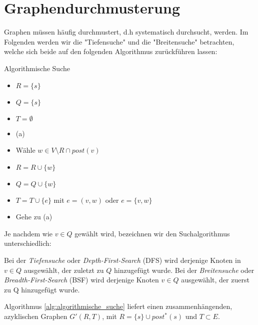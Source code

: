 \section{Graphendurchmusterung}
Graphen müssen häufig durchmustert, d.h systematisch durchsucht, werden. Im Folgenden werden wir die "Tiefensuche" und die "Breitensuche" betrachten, welche sich beide auf den folgenden Algorithmus zurückführen lassen:\\

\begin{algorithm}[H]
\label{alg:algorithmische_suche}
\caption{Algorithmische Suche}
\begin{itemize}
	\item $R=\{s\}$
	\item $Q= \{s\}$
	\item $T= \emptyset$
	\item (a) 
	\item Wähle $w \in  V \setminus R \cap post(v)$
	\item $R=R \cup \{w\}$
	\item $Q=Q \cup \{w\} $
	\item $T= T \cup \{e\} $ mit $e=(v,w)$ oder $e=\{v,w\} $
	\item Gehe zu (a)
\end{itemize}
\end{algorithm}
Je nachdem wie $v \in Q$ gewählt wird, bezeichnen wir den Suchalgorithmus unterschiedlich:
\begin{definition}
Bei der \emph{Tiefensuche} oder \emph{Depth-First-Search} (DFS) wird derjenige Knoten in $v \in  Q$ ausgewählt, der zuletzt zu $Q$ hinzugefügt wurde. Bei der \emph{Breitensuche} oder \emph{Breadth-First-Search} (BSF) wird derjenige Knoten $v \in  Q$ ausgewählt, der zuerst zu Q hinzugefügt wurde.
\end{definition}
\begin{theorem}
Algorithmus \ref{alg:algorithmische_suche} liefert einen zusammenhängenden, azyklischen Graphen $G'(R,T)$, mit $R=\{s\}\cup post^{*}(s)$ und $T \subset E$.
\end{theorem}
